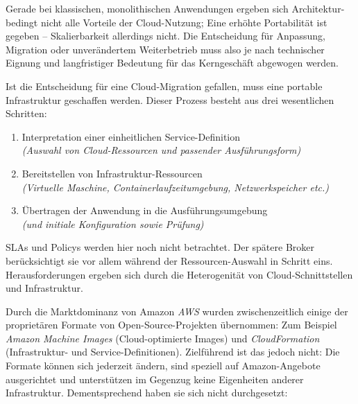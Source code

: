 \noindent
Gerade bei klassischen, monolithischen Anwendungen ergeben sich Architektur-bedingt nicht alle Vorteile der Cloud-Nutzung; Eine erhöhte Portabilität ist gegeben --  Skalierbarkeit allerdings nicht. Die Entscheidung für Anpassung, Migration oder unverändertem Weiterbetrieb muss also je nach technischer Eignung und langfristiger Bedeutung für das Kerngeschäft abgewogen werden.

Ist die Entscheidung für eine Cloud-Migration gefallen, muss eine portable Infrastruktur geschaffen werden. Dieser Prozess besteht aus drei wesentlichen Schritten:

\begin{enumerate}
	
	\item Interpretation einer einheitlichen Service-Definition
	\\\emph{(Auswahl von Cloud-Ressourcen und passender Ausführungsform)}
	
	\item Bereitstellen von Infrastruktur-Ressourcen 
	\\\emph{(Virtuelle Maschine, Containerlaufzeitumgebung, Netzwerkspeicher etc.)}
	
	\item Übertragen der Anwendung in die Ausführungsumgebung
	\\\emph{(und initiale Konfiguration sowie Prüfung)}
	
\end{enumerate}

\noindent
SLAs und Policys werden hier noch nicht betrachtet. Der spätere Broker berücksichtigt sie vor allem während der Ressourcen-Auswahl in Schritt eins. Herausforderungen ergeben sich durch die Heterogenität von Cloud-Schnittstellen und Infrastruktur.

Durch die Marktdominanz von Amazon \emph{AWS} wurden zwischenzeitlich einige der proprietären Formate von Open-Source-Projekten übernommen: Zum Beispiel \emph{Amazon Machine Images} (Cloud-optimierte Images) und \emph{CloudFormation} (Infrastruktur- und Service-Definitionen). Zielführend ist das jedoch nicht: Die Formate können sich jederzeit ändern, sind speziell auf Amazon-Angebote ausgerichtet und unterstützen im Gegenzug keine Eigenheiten anderer Infrastruktur. Dementsprechend haben sie sich nicht durchgesetzt:

